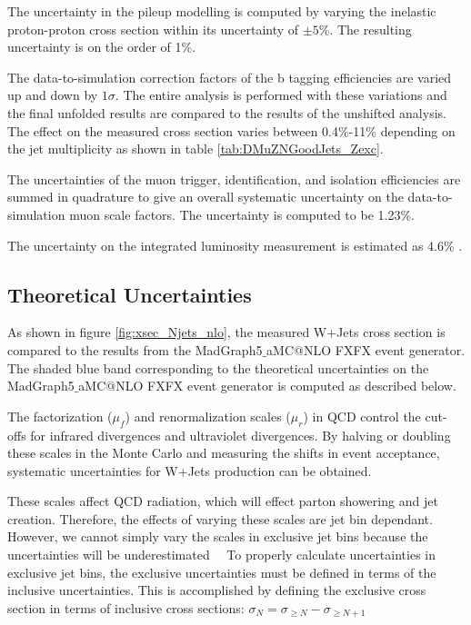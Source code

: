 \documentclass[oneside, letterpaper, oldfontcommands]{memoir}
\begin{document}
\qquad The uncertainty in the pileup modelling is computed by varying the inelastic proton-proton cross section within its uncertainty of $\pm 5\%$. The resulting uncertainty is on the order of 1\%.

\qquad The data-to-simulation correction factors of the b tagging efficiencies are varied up and down by $1 \sigma$. The entire analysis is performed with these variations and the final unfolded results are compared to the results of the unshifted analysis. The effect on the measured cross section varies between 0.4\%-11\% depending on the jet multiplicity as shown in table \ref{tab:DMuZNGoodJets_Zexc}.

\qquad The uncertainties of the muon trigger, identification, and isolation efficiencies are summed in quadrature to give an overall systematic uncertainty on the data-to-simulation muon scale factors. The uncertainty is computed to be 1.23\%.

\qquad The uncertainty on the integrated luminosity measurement is estimated as 4.6\% \cite{CMS-PAS-LUM-15-001}.

\subsection{Theoretical Uncertainties}
\qquad As shown in figure \ref{fig:xsec_Njets_nlo}, the measured W+Jets cross section is compared to the results from the {\sc MadGraph5$\_$aMC@NLO} FXFX event generator. The shaded blue band corresponding to the theoretical uncertainties on the {\sc MadGraph5$\_$aMC@NLO} FXFX event generator is computed as described below.

\qquad The factorization ($\mu_{f}$) and renormalization scales ($\mu_{r}$) in QCD control the cut-offs for infrared divergences and ultraviolet divergences. By halving or doubling these scales in the Monte Carlo and measuring the shifts in event acceptance, systematic uncertainties for W+Jets production can be obtained.

\qquad These scales affect QCD radiation, which will effect parton showering and jet creation. Therefore, the effects of varying these scales are jet bin dependant. However, we cannot simply vary the scales in exclusive jet bins because the uncertainties will be underestimated~\cite{Gangal:2013nxa}~\cite{Stewart:2011cf} To properly calculate uncertainties in exclusive jet bins, the exclusive uncertainties must be defined in terms of the inclusive uncertainties.
This is accomplished by defining the exclusive cross section in terms of inclusive cross sections: $\sigma_{N} = \sigma_{\geq N} - \sigma_{\geq N+1}$
\end{document}
